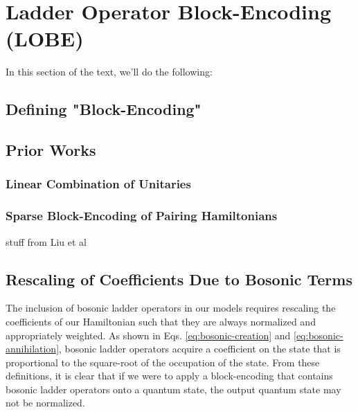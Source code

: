 \section{Ladder Operator Block-Encoding (LOBE)}
\label{sec:lobe}

In this section of the text, we'll do the following:
\subsection{Defining "Block-Encoding"}
\label{subsec:block-encoding}

\subsection{Prior Works}
\label{subsec:prior-works}

\subsubsection{Linear Combination of Unitaries}

\subsubsection{Sparse Block-Encoding of Pairing Hamiltonians}
stuff from Liu et al

\subsection{Rescaling of Coefficients Due to Bosonic Terms}
\label{subsec:rescaling}

The inclusion of bosonic ladder operators in our models requires rescaling the coefficients of our Hamiltonian such that they are always normalized and appropriately weighted.
As shown in Eqs. \ref{eq:bosonic-creation} and \ref{eq:bosonic-annihilation}, bosonic ladder operators acquire a coefficient on the state that is proportional to the square-root of the occupation of the state.
From these definitions, it is clear that if we were to apply a block-encoding that contains bosonic ladder operators onto a quantum state, the output quantum state may not be normalized.

